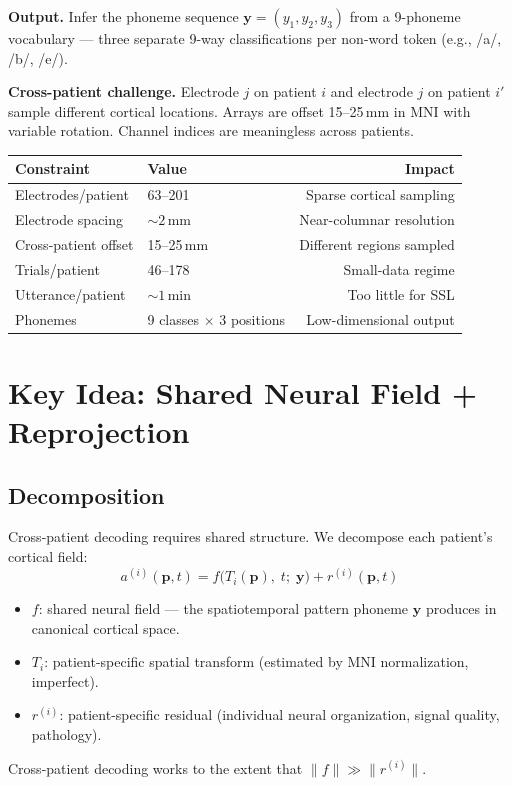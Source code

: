\documentclass[11pt,letterpaper]{article}
\newcommand{\bfp}{\mathbf{p}}
\newcommand{\bfy}{\mathbf{y}}
\begin{document}
\textbf{Output.} Infer the phoneme sequence $\bfy = (y_1, y_2, y_3)$ from a 9-phoneme vocabulary --- three separate 9-way classifications per non-word token (e.g., /a/, /b/, /e/).

\textbf{Cross-patient challenge.} Electrode $j$ on patient $i$ and electrode $j$ on patient $i'$ sample different cortical locations. Arrays are offset 15--25\,mm in MNI with variable rotation. Channel indices are meaningless across patients.

\begin{table}[ht!]
\centering\small
\begin{tabular}{@{}llr@{}}
\toprule
\textbf{Constraint} & \textbf{Value} & \textbf{Impact} \\
\midrule
Electrodes/patient & 63--201 & Sparse cortical sampling \\
Electrode spacing & ${\sim}2$\,mm & Near-columnar resolution \\
Cross-patient offset & 15--25\,mm & Different regions sampled \\
Trials/patient & 46--178 & Small-data regime \\
Utterance/patient & ${\sim}1$\,min & Too little for SSL \\
Phonemes & 9 classes $\times$ 3 positions & Low-dimensional output \\
\bottomrule
\end{tabular}
\end{table}



\section{Key Idea: Shared Neural Field + Reprojection}\label{sec:idea}

\subsection{Decomposition}

Cross-patient decoding requires shared structure. We decompose each patient's cortical field:
\begin{equation}\label{eq:decomposition}
a^{(i)}(\bfp, t) = f\bigl(T_i(\bfp),\; t;\; \bfy\bigr) + r^{(i)}(\bfp, t)
\end{equation}
\begin{itemize}[leftmargin=2em]
\item $f$: shared neural field --- the spatiotemporal pattern phoneme $\bfy$ produces in canonical cortical space.
\item $T_i$: patient-specific spatial transform (estimated by MNI normalization, imperfect).
\item $r^{(i)}$: patient-specific residual (individual neural organization, signal quality, pathology).
\end{itemize}
Cross-patient decoding works to the extent that $\|f\| \gg \|r^{(i)}\|$.
\end{document}
